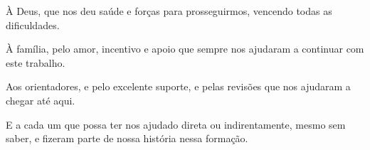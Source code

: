 \begin{agradecimentos}

À Deus, que nos deu saúde e forças para prosseguirmos, vencendo todas as dificuldades.

À família, pelo amor, incentivo e apoio que sempre nos ajudaram a continuar com este trabalho.

Aos orientadores, {\imprimirorientador} e {\imprimircoorientador} pelo excelente suporte, e pelas revisões que nos ajudaram a chegar até aqui.

E a cada um que possa ter nos ajudado direta ou indirentamente, mesmo sem saber, e fizeram parte de nossa história nessa formação.

\end{agradecimentos}

